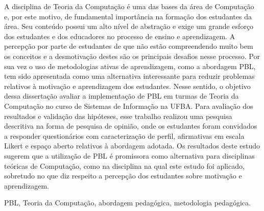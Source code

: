 \resumo
A disciplina de Teoria da Computação é uma das bases
da área de Computação e, por este motivo, de
fundamental importância na formação dos estudantes
da área.
Seu conteúdo possui um alto nível de abstração e exige
um grande esforço dos estudantes e dos educadores
no processo de ensino e aprendizagem.
A percepção por parte de estudantes de
que não estão compreendendo muito bem os conceitos e
a desmotivação destes são os principais desafios nesse processo.
Por sua vez o uso de metodologias ativas de aprendizagem, como
a abordagem \ac{PBL}, tem sido apresentada
como uma alternativa interessante para reduzir problemas relativos à motivação
e aprendizagem dos estudantes.
Nesse sentido, o objetivo dessa dissertação avaliar a implementação
de \ac{PBL} em turmas de Teoria da Computação no curso de Sistemas
de Informação na \ac{UFBA}.
Para avaliação dos resultados e validação das hipóteses,
esse trabalho realizou uma pesquisa descritiva na forma
de pesquisa de opinião, onde
os estudantes foram convidados a responder questionários com
caracterização de perfil, afirmativas em escala Likert e
espaço aberto relativos à abordagem adotada. 
Os resultados deste estudo sugerem que a utilização de \ac{PBL}
é promissora como alternativa para disciplinas teóricas
de Computação, como na disciplina na qual este estudo foi
aplicado, sobretudo no que diz respeito a percepção
dos estudantes sobre motivação e aprendizagem.
\begin{keywords}
\ac{PBL}, Teoria da Computação, abordagem pedagógica, metodologia pedagógica.
\end{keywords}
